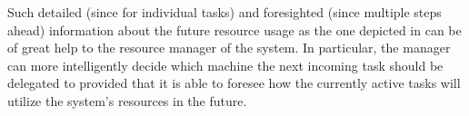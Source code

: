 Such detailed (since for individual tasks) and foresighted (since multiple steps
ahead) information about the future resource usage as the one depicted in
 can be of great help to the resource manager of the
system. In particular, the manager can more intelligently decide which machine
the next incoming task should be delegated to provided that it is able to
foresee how the currently active tasks will utilize the system's resources in
the future.
